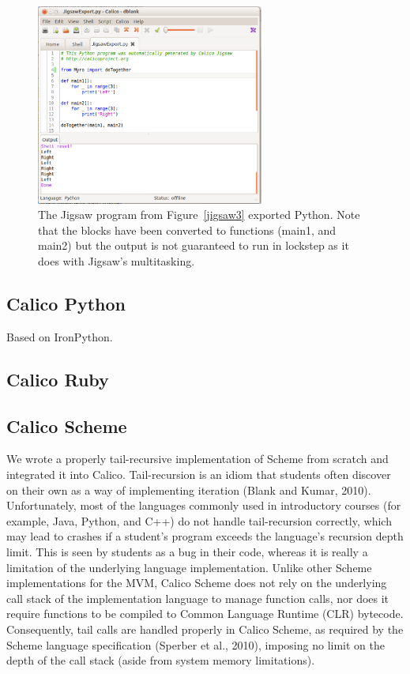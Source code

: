 \documentclass[preprint]{sigplanconf}
\begin{document}
\begin{figure}[h!]
  \centering
    \includegraphics[width=75mm]{jigsaw4.eps} 
  \caption{The Jigsaw program from Figure~\ref{jigsaw3} exported
    Python. Note that the blocks have been converted to functions
    (main1, and main2) but the output is not guaranteed to run in
    lockstep as it does with Jigsaw's multitasking.}
  \label{jigsaw4}
\end{figure}

\subsection{Calico Python}

Based on IronPython. 

\subsection{Calico Ruby}

\subsection{Calico Scheme}

We wrote a properly tail-recursive implementation of Scheme from
scratch and integrated it into Calico.  Tail-recursion is an idiom that
students often discover on their own as a way of implementing
iteration (Blank and Kumar, 2010). Unfortunately, most of the
languages commonly used in introductory courses (for example, Java,
Python, and C++) do not handle tail-recursion correctly, which may
lead to crashes if a student’s program exceeds the language’s
recursion depth limit. This is seen by students as a bug in their
code, whereas it is really a limitation of the underlying language
implementation. Unlike other Scheme implementations for the MVM,
Calico Scheme does not rely on the underlying call stack of the
implementation language to manage function calls, nor does it require
functions to be compiled to Common Language Runtime (CLR)
bytecode. Consequently, tail calls are handled properly in Calico
Scheme, as required by the Scheme language specification (Sperber et
al., 2010), imposing no limit on the depth of the call stack (aside
from system memory limitations).
\end{document}
